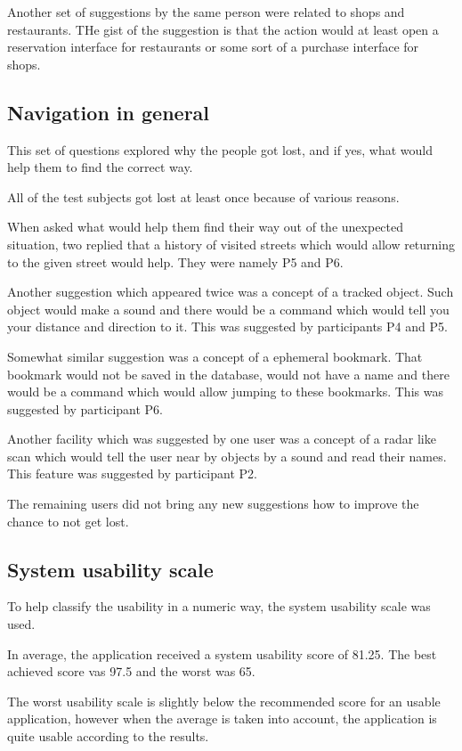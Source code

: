 \documentclass[nolof,digital]{fithesis3}
\begin{document}
Another  set of suggestions by the same person were related to shops and restaurants. THe gist of the suggestion is that the action would at least open a reservation interface for restaurants or some sort of a purchase interface for shops.
\subsection{Navigation in general}
This set of questions explored why the people got lost, and if yes, what would help them to find the correct way.

All of the test subjects got lost at least once because of various reasons.

When asked what would help them find their way out of the unexpected situation, two replied that a history of visited streets which would allow returning to the given street would help. They were namely P5 and P6.

Another suggestion which appeared twice was a concept of a tracked object. Such object would make a sound and there would be a command which would tell you your distance and direction to it. This was suggested by participants P4 and P5.

Somewhat similar suggestion was a concept of a ephemeral bookmark. That bookmark would not be saved in the database, would not have a name and there would be a command which would allow jumping to these bookmarks. This was suggested by participant P6.

Another facility which was suggested by one user was a concept of a radar like scan which would tell the user near by objects by a sound and read their names. This feature was suggested by participant P2.

The  remaining users did not bring any new suggestions how to improve the chance to not get lost.
\subsection{System usability scale}
To help classify the usability in a numeric way, the system usability scale was used.

In average, the application received a system usability score of 81.25. The best achieved score vas 97.5 and the worst was 65.

The worst usability scale is slightly below the recommended score for an usable application, however when the average is taken into account, the application is quite usable according to the results.
\end{document}
